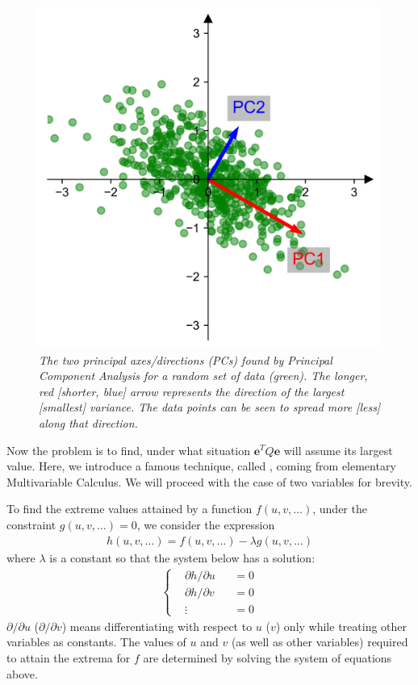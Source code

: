 \begin{figure}[ht!]
    \centering
    \includegraphics{graphics/PCA_first_demo.png}
    \caption{\textit{The two principal axes/directions (PCs) found by Principal Component Analysis for a random set of data (green). The longer, red [shorter, blue] arrow represents the direction of the largest [smallest] variance. The data points can be seen to spread more [less] along that direction.}}
\end{figure}
Now the problem is to find, under what situation $\textbf{e}^T Q \textbf{e}$ will assume its largest value. Here, we introduce a famous technique, called , coming from elementary Multivariable Calculus. We will proceed with the case of two variables for brevity.
\begin{thm}
\label{thm:LagrangeMul}
To find the extreme values attained by a function $f(u,v,\ldots)$, under the constraint $g(u,v,\ldots) = 0$, we consider the expression
\begin{align}
h(u,v,\ldots) = f(u,v,\ldots) - \lambda g(u,v,\ldots)
\end{align}
where $\lambda$ is a constant so that the system below has a solution:
\begin{align}
\left\{\begin{alignedat}{2}
&\partial h/\partial u & &= 0 \\
&\partial h/\partial v & &= 0 \\
&\vdots & &= 0
\end{alignedat}\right.
\end{align}
$\partial/\partial u$ ($\partial/\partial v$) means differentiating with respect to $u$ ($v$) only while treating other variables as constants. The values of $u$ and $v$ (as well as other variables) required to attain the extrema for $f$ are determined by solving the system of equations above. 
\end{thm}
